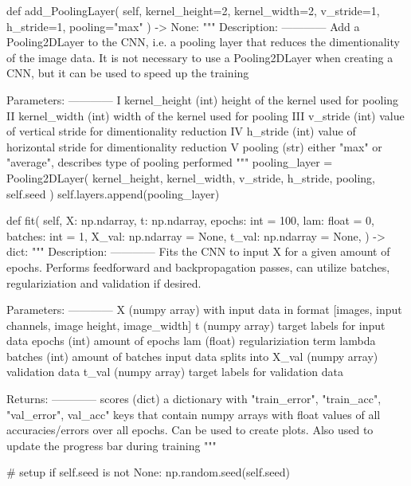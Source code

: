 \documentclass[%
oneside,                 %
final,                   %
10pt]{article}
\begin{document}
    def add_PoolingLayer(
        self, kernel_height=2, kernel_width=2, v_stride=1, h_stride=1, pooling="max"
    ) -> None:
        """
        Description:
        ------------
            Add a Pooling2DLayer to the CNN, i.e. a pooling layer that reduces the dimentionality of
            the image data. It is not necessary to use a Pooling2DLayer when creating a CNN, but it
            can be used to speed up the training

        Parameters:
        ------------
            I   kernel_height (int) height of the kernel used for pooling
            II  kernel_width (int) width of the kernel used for pooling
            III v_stride (int) value of vertical stride for dimentionality reduction
            IV  h_stride (int) value of horizontal stride for dimentionality reduction
            V   pooling (str) either "max" or "average", describes type of pooling performed
        """
        pooling_layer = Pooling2DLayer(
            kernel_height, kernel_width, v_stride, h_stride, pooling, self.seed
        )
        self.layers.append(pooling_layer)

    def fit(
        self,
        X: np.ndarray,
        t: np.ndarray,
        epochs: int = 100,
        lam: float = 0,
        batches: int = 1,
        X_val: np.ndarray = None,
        t_val: np.ndarray = None,
    ) -> dict:
        """
        Description:
        ------------
            Fits the CNN to input X for a given amount of epochs. Performs feedforward and backpropagation passes,
            can utilize batches, regulariziation and validation if desired.

        Parameters:
        ------------
            X (numpy array) with input data in format [images, input channels,
            image height, image_width]
            t (numpy array) target labels for input data
            epochs (int) amount of epochs
            lam (float) regulariziation term lambda
            batches (int) amount of batches input data splits into
            X_val (numpy array) validation data
            t_val (numpy array) target labels for validation data

        Returns:
        ------------
            scores (dict) a dictionary with "train_error", "train_acc", "val_error", val_acc" keys
            that contain numpy arrays with float values of all accuracies/errors over all epochs.
            Can be used to create plots. Also used to update the progress bar during training
        """

        # setup
        if self.seed is not None:
            np.random.seed(self.seed)
\end{document}
